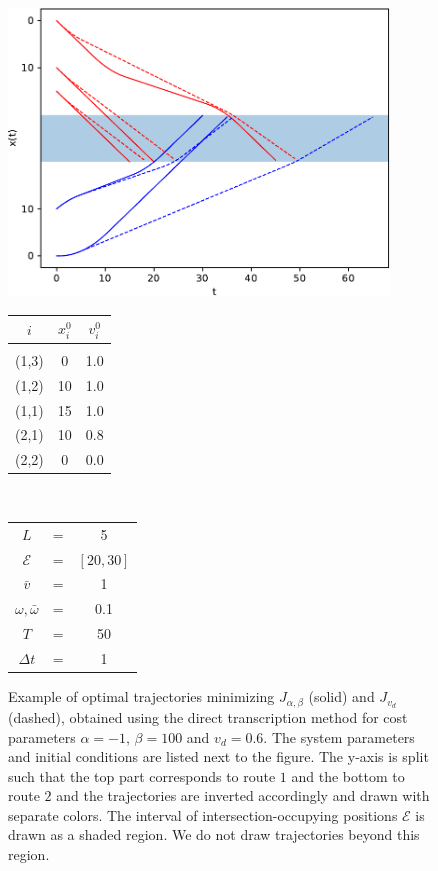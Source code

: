 \documentclass[a4paper]{report}
\theoremstyle{definition}
\theoremstyle{plain}
\begin{document}
\begin{figure}
  \centering
  \begin{minipage}{0.76\textwidth}
  \includegraphics[width=0.9\textwidth]{figures/single/trajectories_general.pdf}%
  \end{minipage}
  \begin{minipage}{0.23\textwidth}
  \vspace*{-1em}
  \begin{tabular}{ c c c }
    $i$ & $x_{i}^{0}$ & $v_{i}^{0}$ \\[0.2em]
    \hline\\[-1em]
    {\color{red}(1,3)} &  0 & 1.0 \\
    {\color{red}(1,2)} & 10 & 1.0 \\
    {\color{red}(1,1)} & 15 & 1.0 \\
    {\color{blue}(2,1)} & 10 & 0.8 \\
    {\color{blue}(2,2)} &  0 & 0.0
  \end{tabular}
  \\[2em]
  \begin{tabular}{ c c c }
    $L$ & = &  5 \\
    $\mathcal{E}$ & = & $[20, 30]$ \\
    $\bar{v}$ & = & 1 \\
    $\omega, \bar{\omega}$ & = & 0.1 \\
    $T$ & = & 50 \\
    $\Delta t$ & = & 1
  \end{tabular}
  \end{minipage}
  \caption{Example of optimal trajectories minimizing $J_{\alpha,\beta}$ (solid)
    and $J_{v_{d}}$ (dashed), obtained using the direct transcription method for
    cost parameters $\alpha = -1, \, \beta = 100$ and $v_{d} = 0.6$. The system
    parameters and initial conditions are listed next to the figure. The y-axis
    is split such that the top part corresponds to route $1$ and the bottom to
    route $2$ and the trajectories are inverted accordingly and drawn with
    separate colors. The interval of intersection-occupying positions
    $\mathcal{E}$ is drawn as a shaded region. We do not draw trajectories
    beyond this region.}%
  \label{fig:direct_transcription_example}
\end{figure}
\end{document}
